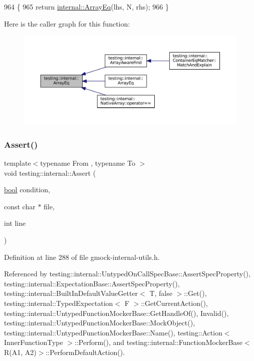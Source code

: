 \begin{DoxyCode}
964                                                         \{
965   \textcolor{keywordflow}{return} \hyperlink{namespacetesting_1_1internal_a5cb6f81ee827130024261121c742b26c}{internal::ArrayEq}(lhs, N, rhs);
966 \}
\end{DoxyCode}
Here is the caller graph for this function\+:
\nopagebreak
\begin{figure}[H]
\begin{center}
\leavevmode
\includegraphics[width=350pt]{namespacetesting_1_1internal_a5cb6f81ee827130024261121c742b26c_icgraph}
\end{center}
\end{figure}
\mbox{\label{namespacetesting_1_1internal_a7a259643b7f2d23ce2b757728df42c99}} 
\subsubsection{\texorpdfstring{Assert()}{Assert()}}
{\footnotesize\ttfamily template$<$typename From , typename To $>$ \\
void testing\+::internal\+::\+Assert (\begin{DoxyParamCaption}\item[{\hyperlink{classbool}{bool}}]{condition,  }\item[{const char $\ast$}]{file,  }\item[{int}]{line }\end{DoxyParamCaption})\hspace{0.3cm}{\ttfamily [inline]}}



Definition at line 288 of file gmock-\/internal-\/utils.\+h.



Referenced by testing\+::internal\+::\+Untyped\+On\+Call\+Spec\+Base\+::\+Assert\+Spec\+Property(), testing\+::internal\+::\+Expectation\+Base\+::\+Assert\+Spec\+Property(), testing\+::internal\+::\+Built\+In\+Default\+Value\+Getter$<$ T, false $>$\+::\+Get(), testing\+::internal\+::\+Typed\+Expectation$<$ F $>$\+::\+Get\+Current\+Action(), testing\+::internal\+::\+Untyped\+Function\+Mocker\+Base\+::\+Get\+Handle\+Of(), Invalid(), testing\+::internal\+::\+Untyped\+Function\+Mocker\+Base\+::\+Mock\+Object(), testing\+::internal\+::\+Untyped\+Function\+Mocker\+Base\+::\+Name(), testing\+::\+Action$<$ Inner\+Function\+Type $>$\+::\+Perform(), and testing\+::internal\+::\+Function\+Mocker\+Base$<$ R(\+A1, A2)$>$\+::\+Perform\+Default\+Action().


